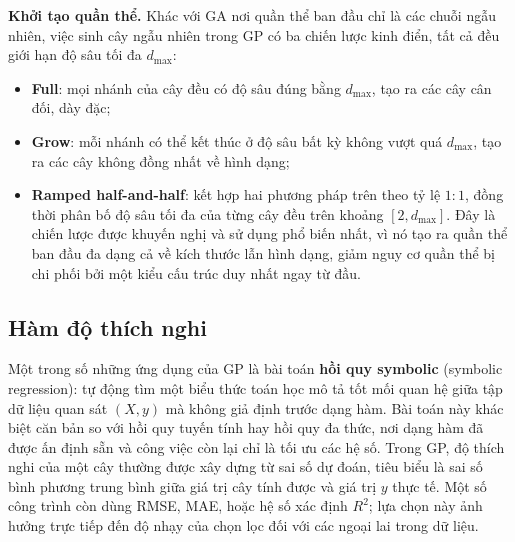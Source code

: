 \textbf{Khởi tạo quần thể.} Khác với GA nơi quần thể ban đầu chỉ là các
chuỗi ngẫu nhiên, việc sinh cây ngẫu nhiên trong GP có ba chiến lược
kinh điển, tất cả đều giới hạn độ sâu tối đa $d_{\max}$:
\begin{itemize}
    \item \textbf{Full}: mọi nhánh của cây đều có
    độ sâu đúng bằng $d_{\max}$, tạo ra các cây cân đối, dày đặc;
    \item \textbf{Grow}: mỗi nhánh có thể kết thúc ở
    độ sâu bất kỳ không vượt quá $d_{\max}$, tạo ra các cây không đồng
    nhất về hình dạng;
    \item \textbf{Ramped half-and-half}:
    kết hợp hai phương pháp trên theo tỷ lệ $1:1$, đồng thời phân bố
    độ sâu tối đa của từng cây đều trên khoảng
    $[2, d_{\max}]$. Đây là chiến lược được khuyến nghị và sử dụng
    phổ biến nhất, vì nó tạo ra quần thể ban đầu đa dạng cả về kích
    thước lẫn hình dạng, giảm nguy cơ quần thể bị chi phối bởi một
    kiểu cấu trúc duy nhất ngay từ đầu.
\end{itemize}

\subsection*{Hàm độ thích nghi}

Một trong số những ứng dụng của GP là bài toán \textbf{hồi quy symbolic}
(symbolic regression): tự động tìm một biểu thức toán học mô tả tốt
mối quan hệ giữa tập dữ liệu quan sát $(X, y)$ mà không giả định trước
dạng hàm. Bài toán này khác biệt căn bản so với hồi quy tuyến tính hay
hồi quy đa thức, nơi dạng hàm đã được ấn định sẵn và công việc còn lại
chỉ là tối ưu các hệ số. Trong GP, độ thích nghi của một cây thường
được xây dựng từ sai số dự đoán, tiêu biểu là sai số bình phương trung
bình giữa giá trị cây tính được và giá trị $y$ thực tế. Một số
công trình còn dùng RMSE, MAE, hoặc hệ số xác định $R^2$; lựa chọn
này ảnh hưởng trực tiếp đến độ nhạy của chọn lọc đối với các ngoại lai
trong dữ liệu.

